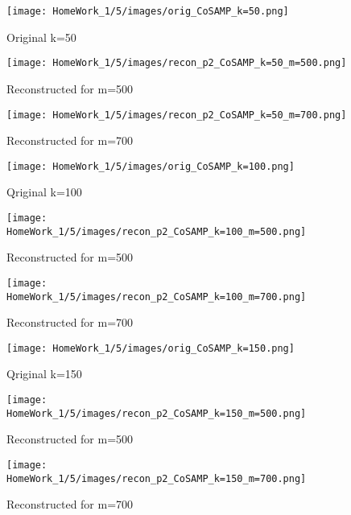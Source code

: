 \documentclass{article}
\begin{document}
\begin{figure}[h!]
    \centering
    \begin{minipage}{0.1\textwidth}
        \texttt{[image: HomeWork\_1/5/images/orig\_CoSAMP\_k=50.png]}
        \caption{Original k=50}
    \end{minipage}
    \hspace{0.5cm}
    \begin{minipage}{0.1\textwidth}
        \centering
        \texttt{[image: HomeWork\_1/5/images/recon\_p2\_CoSAMP\_k=50\_m=500.png]}
        \caption{Reconstructed for m=500}
    \end{minipage}
    \hspace{0.5cm}
    \begin{minipage}{0.1\textwidth}
        \centering
        \texttt{[image: HomeWork\_1/5/images/recon\_p2\_CoSAMP\_k=50\_m=700.png]}
        \caption{Reconstructed for m=700}
    \end{minipage}
\end{figure}

\begin{figure}[h!]
    \centering
    \begin{minipage}{0.1\textwidth}
        \texttt{[image: HomeWork\_1/5/images/orig\_CoSAMP\_k=100.png]}
        \caption{Qriginal k=100}
    \end{minipage}
    \hspace{0.5cm}
    \begin{minipage}{0.1\textwidth}
        \centering
        \texttt{[image: HomeWork\_1/5/images/recon\_p2\_CoSAMP\_k=100\_m=500.png]}
        \caption{Reconstructed for m=500}
    \end{minipage}
    \hspace{0.5cm}
    \begin{minipage}{0.1\textwidth}
        \centering
        \texttt{[image: HomeWork\_1/5/images/recon\_p2\_CoSAMP\_k=100\_m=700.png]}
        \caption{Reconstructed for m=700}
    \end{minipage}
\end{figure}

\begin{figure}[h!]
    \centering
    \begin{minipage}{0.1\textwidth}
        \texttt{[image: HomeWork\_1/5/images/orig\_CoSAMP\_k=150.png]}
        \caption{Qriginal k=150}
    \end{minipage}
    \hspace{0.5cm}
    \begin{minipage}{0.1\textwidth}
        \centering
        \texttt{[image: HomeWork\_1/5/images/recon\_p2\_CoSAMP\_k=150\_m=500.png]}
        \caption{Reconstructed for m=500}
    \end{minipage}
    \hspace{0.5cm}
    \begin{minipage}{0.1\textwidth}
        \centering
        \texttt{[image: HomeWork\_1/5/images/recon\_p2\_CoSAMP\_k=150\_m=700.png]}
        \caption{Reconstructed for m=700}
    \end{minipage}
\end{figure}
\end{document}
